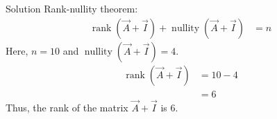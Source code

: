 \documentclass{beamer}
\begin{document}
\begin{frame}{Solution}
Rank-nullity theorem:
\begin{align}
\operatorname{rank}(\vec{A}+\vec{I}) + \operatorname{nullity}(\vec{A}+\vec{I}) &= n
\end{align}
Here, $n=10$ and $\operatorname{nullity}(\vec{A}+\vec{I})=4$.
\begin{align}
\operatorname{rank}(\vec{A}+\vec{I}) &= 10 - 4 \\
&= 6
\end{align}
Thus, the rank of the matrix $\vec{A}+\vec{I}$ is 6.
\end{frame}
\end{document}
